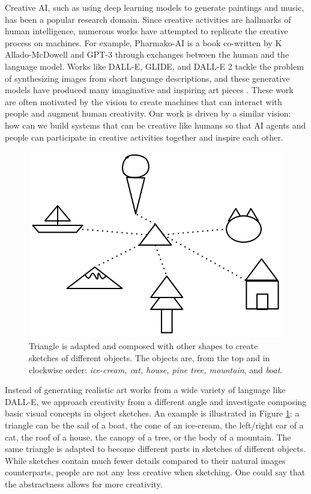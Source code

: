 Creative AI, such as using deep learning models to generate paintings and music, has been a popular research domain.
Since creative activities are hallmarks of human intelligence, numerous works have attempted to replicate the creative process on machines.
For example, Pharmako-AI \citep{allado-mcdowell_okojie_2020} is a book co-written by K Allado-McDowell and GPT-3 \citep{gpt3} through exchanges between the human and the language model. 
Works like DALL-E, GLIDE, and DALL-E 2 tackle the problem of synthesizing images from short language descriptions, and these generative models have produced many imaginative and inspiring art pieces \citep{dallePaper,glidePaper,dalle2Paper}.
These work are often motivated by the vision to create machines that can interact with people and augment human creativity.  
Our work is driven by a similar vision: how can we build systems that can be creative like humans so that AI agents and people can participate in creative activities together and inspire each other. 

\begin{figure}[!htb]
\centering
\includegraphics[width=.3\linewidth]{introduction/sketch_composition.png}  
\caption{Triangle is adapted and composed with other shapes to create sketches of different objects. The objects are, from the top and in clockwise order: \textit{ice-cream, cat, house, pine tree, mountain}, and \textit{boat}.}
\label{introduction.composition}
\end{figure}

Instead of generating realistic art works from a wide variety of language like DALL-E, we approach creativity from a different angle and investigate composing basic visual concepts in object sketches.
An example is illustrated in Figure \ref{introduction.composition}: a triangle can be the sail of a boat, the cone of an ice-cream, the left/right ear of a cat, the roof of a house, the canopy of a tree, or the body of a mountain. The same triangle is adapted to become different parts in sketches of different objects. 
While sketches contain much fewer details compared to their natural images counterparts, people are not any less creative when sketching. One could say that the abstractness allows for more creativity. 


